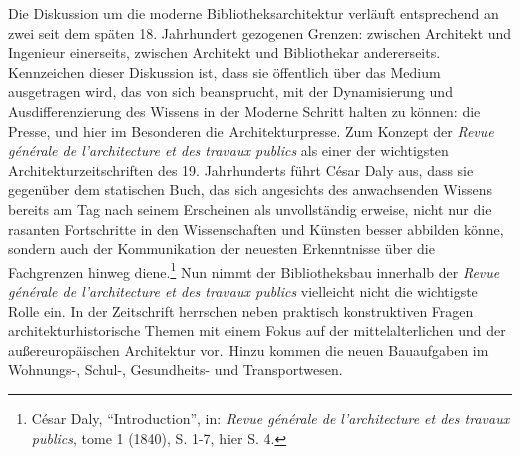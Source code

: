 Die Diskussion um die moderne Bibliotheksarchitektur verläuft
entsprechend an zwei seit dem späten 18. Jahrhundert gezogenen Grenzen:
zwischen Architekt und Ingenieur einerseits, zwischen Architekt und
Bibliothekar andererseits. Kennzeichen dieser Diskussion ist, dass sie
öffentlich über das Medium ausgetragen wird, das von sich beansprucht,
mit der Dynamisierung und Ausdifferenzierung des Wissens in der Moderne
Schritt halten zu können: die Presse, und hier im Besonderen die
Architekturpresse. Zum Konzept der \emph{Revue générale de
l'architecture et des travaux publics} als einer der wichtigsten
Architekturzeitschriften des 19. Jahrhunderts führt César Daly aus, dass
sie gegenüber dem statischen Buch, das sich angesichts des anwachsenden
Wissens bereits am Tag nach seinem Erscheinen als unvollständig erweise,
nicht nur die rasanten Fortschritte in den Wissenschaften und Künsten
besser abbilden könne, sondern auch der Kommunikation der neuesten
Erkenntnisse über die Fachgrenzen hinweg diene.\footnote{César Daly,
  \enquote{Introduction}, in: \emph{Revue générale de l'architecture et
  des travaux publics}, tome 1 (1840), S. 1-7, hier S. 4.} Nun nimmt der
Bibliotheksbau innerhalb der \emph{Revue générale de l'architecture et
des travaux publics} vielleicht nicht die wichtigste Rolle ein. In der
Zeitschrift herrschen neben praktisch konstruktiven Fragen
architekturhistorische Themen mit einem Fokus auf der mittelalterlichen
und der außereuropäischen Architektur vor. Hinzu kommen die neuen
Bauaufgaben im Wohnungs-, Schul-, Gesundheits- und Transportwesen.

